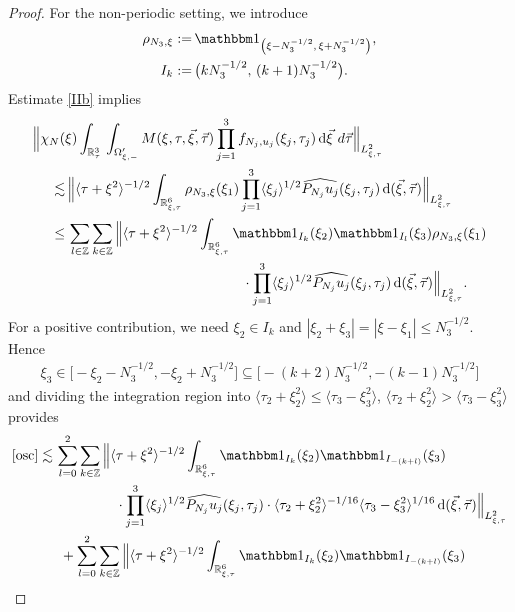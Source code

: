 \documentclass[reqno]{amsart}
\theoremstyle{Definitionl}
\theoremstyle{Definitionk}
\theoremstyle{definition}
\theoremstyle{Satzk}
\theoremstyle{Satzl}
\theoremstyle{Bemerkung}
\begin{document}
\begin{proof}
For the non-periodic setting, we introduce 
\begin{align*}
\rho_{N_3,\xi}:=&\,\mathbbm1_{\left(\xi-N_3^{-1/2},\,\xi+N_3^{-1/2}\right)},\\
I_k:=&\,\big(kN_3^{-1/2},\,(k+1)N_3^{-1/2}\big).
\end{align*} 
Estimate \eqref{IIb} implies
\begin{align}
\Big\|\chi_N(&\xi)\int_{\mathbb R^3_\tau}\,\int_{\Omega'_{\xi,-}}M(\xi,\tau,\vec\xi,\vec\tau)\prod_{j=1}^3f_{N_j,u_j}(\xi_j,\tau_j)\,\mathrm d\vec\xi\,\mathrm\,d\vec\tau\Big\|_{L^2_{\xi,\tau}}\nonumber\\
\lesssim&\, \Big\|\langle\tau+\xi^2\rangle^{-1/2}\int_{\mathbb R^6_{\xi,\tau}}\rho_{N_3,\xi}(\xi_1)\prod_{j=1}^3\langle\xi_j\rangle^{1/2}\widehat{P_{N_j}u_j}(\xi_j,\tau_j)\,\mathrm d(\vec\xi,\vec\tau)\Big\|_{L^2_{\xi,\tau}}\nonumber\\
\le&\,\sum_{l\in\mathbb Z}\sum_{k\in\mathbb Z}\Big\|\langle\tau+\xi^2\rangle^{-1/2}\int_{\mathbb R^6_{\xi,\tau}}\mathbbm1_{I_k}(\xi_2)\mathbbm1_{I_l}(\xi_3)\rho_{N_3,\xi}(\xi_1)\nonumber\\
&\ \ \ \ \ \ \ \ \ \ \ \ \ \ \ \ \ \ \ \ \ \ \ \ \ \ \ \ \ \ \ \ \ \ \ \ \ \ \cdot\prod_{j=1}^3\langle\xi_j\rangle^{1/2}\widehat{P_{N_j}u_j}(\xi_j,\tau_j)\,\mathrm d(\vec\xi,\vec\tau)\Big\|_{L^2_{\xi,\tau}}.\label{osc}
\end{align}
For a positive contribution, we need $\xi_2\in I_k$ and $|\xi_2+\xi_3|=|\xi-\xi_1|\le N_3^{-1/2}$. Hence
\begin{align*}
\xi_3\in\big[-\xi_2-N_3^{-1/2},-\xi_2+N_3^{-1/2}\big]\subseteq\big[-(k+2)N_3^{-1/2},-(k-1)N_3^{-1/2}\big]\end{align*} and dividing the integration region into $\langle\tau_2+\xi_2^2\rangle\le\langle\tau_3-\xi_3^2\rangle$, $\langle\tau_2+\xi_2^2\rangle>\langle\tau_3-\xi_3^2\rangle$ provides
\begin{align*}
\eqref{osc}\lesssim&\,\sum_{l=0}^2\sum_{k\in\mathbb Z}\Big\|\langle\tau+\xi^2\rangle^{-1/2}\int_{\mathbb R^6_{\xi,\tau}}\mathbbm1_{I_k}(\xi_2)\mathbbm1_{I_{-(k+l)}}(\xi_3)\\
&\,\ \ \ \ \ \ \ \ \ \ \ \ \ \cdot\prod_{j=1}^3\langle\xi_j\rangle^{1/2}\widehat{P_{N_j}u_j}(\xi_j,\tau_j)\cdot\langle\tau_2+\xi_2^2\rangle^{-1/16}\langle\tau_3-\xi_3^2\rangle^{1/16} \,\mathrm d(\vec\xi,\vec\tau)\Big\|_{L^2_{\xi,\tau}}\\
&\,\ +\sum_{l=0}^2\sum_{k\in\mathbb Z}\Big\|\langle\tau+\xi^2\rangle^{-1/2}\int_{\mathbb R^6_{\xi,\tau}}\mathbbm1_{I_k}(\xi_2)\mathbbm1_{I_{-(k+l)}}(\xi_3)\\

\end{align*}
\end{proof}
\end{document}
